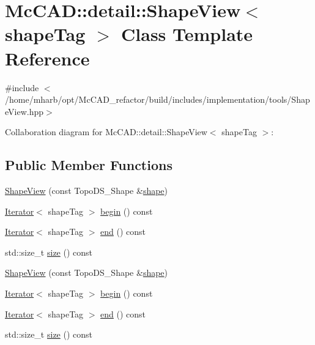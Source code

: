 \hypertarget{classMcCAD_1_1detail_1_1ShapeView}{}\section{Mc\+C\+AD\+:\+:detail\+:\+:Shape\+View$<$ shape\+Tag $>$ Class Template Reference}
\label{classMcCAD_1_1detail_1_1ShapeView}


{\ttfamily \#include $<$/home/mharb/opt/\+Mc\+C\+A\+D\+\_\+refactor/build/includes/implementation/tools/\+Shape\+View.\+hpp$>$}



Collaboration diagram for Mc\+C\+AD\+:\+:detail\+:\+:Shape\+View$<$ shape\+Tag $>$\+:
\subsection*{Public Member Functions}
\begin{DoxyCompactItemize}
\item 
\hyperlink{classMcCAD_1_1detail_1_1ShapeView_a8d438ce001926e69285a3096088be6a4}{Shape\+View} (const Topo\+D\+S\+\_\+\+Shape \&\hyperlink{classMcCAD_1_1detail_1_1ShapeView_a1bb072976e70ad902ce623a53783c531}{shape})
\item 
\hyperlink{classMcCAD_1_1detail_1_1Iterator}{Iterator}$<$ shape\+Tag $>$ \hyperlink{classMcCAD_1_1detail_1_1ShapeView_a30bb0884965301931cdb1faef6276024}{begin} () const
\item 
\hyperlink{classMcCAD_1_1detail_1_1Iterator}{Iterator}$<$ shape\+Tag $>$ \hyperlink{classMcCAD_1_1detail_1_1ShapeView_a5f61d0f58a0cc6bf8ced63a6bde92009}{end} () const
\item 
std\+::size\+\_\+t \hyperlink{classMcCAD_1_1detail_1_1ShapeView_a664f15209591585832c5438c4aff42ca}{size} () const
\item 
\hyperlink{classMcCAD_1_1detail_1_1ShapeView_a8d438ce001926e69285a3096088be6a4}{Shape\+View} (const Topo\+D\+S\+\_\+\+Shape \&\hyperlink{classMcCAD_1_1detail_1_1ShapeView_a1bb072976e70ad902ce623a53783c531}{shape})
\item 
\hyperlink{classMcCAD_1_1detail_1_1Iterator}{Iterator}$<$ shape\+Tag $>$ \hyperlink{classMcCAD_1_1detail_1_1ShapeView_a30bb0884965301931cdb1faef6276024}{begin} () const
\item 
\hyperlink{classMcCAD_1_1detail_1_1Iterator}{Iterator}$<$ shape\+Tag $>$ \hyperlink{classMcCAD_1_1detail_1_1ShapeView_a5f61d0f58a0cc6bf8ced63a6bde92009}{end} () const
\item 
std\+::size\+\_\+t \hyperlink{classMcCAD_1_1detail_1_1ShapeView_a664f15209591585832c5438c4aff42ca}{size} () const
\end{DoxyCompactItemize}

